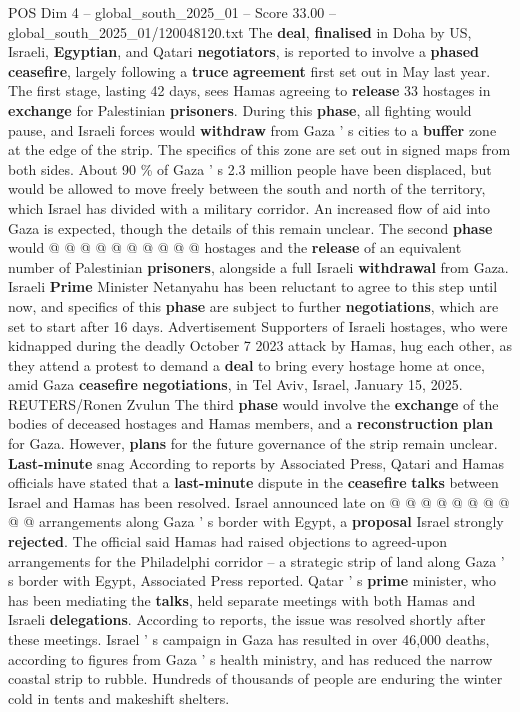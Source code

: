 \begin{textsample}{POS Dim 4 – global\_south\_2025\_01 – Score 33.00 – global\_south\_2025\_01/120048120.txt}
The \textbf{deal}, \textbf{finalised} in Doha by US, Israeli, \textbf{Egyptian}, and Qatari \textbf{negotiators}, is reported to involve a \textbf{phased} \textbf{ceasefire}, largely following a \textbf{truce} \textbf{agreement} first set out in May last year.
The first stage, lasting 42 days, sees Hamas agreeing to \textbf{release} 33 hostages in \textbf{exchange} for Palestinian \textbf{prisoners}.
During this \textbf{phase}, all fighting would pause, and Israeli forces would \textbf{withdraw} from Gaza ' s cities to a \textbf{buffer} zone at the edge of the strip.
The specifics of this zone are set out in signed maps from both sides.
About 90 \% of Gaza ' s 2.3 million people have been displaced, but would be allowed to move freely between the south and north of the territory, which Israel has divided with a military corridor.
An increased flow of aid into Gaza is expected, though the details of this remain unclear.
The second \textbf{phase} would @ @ @ @ @ @ @ @ @ @ hostages and the \textbf{release} of an equivalent number of Palestinian \textbf{prisoners}, alongside a full Israeli \textbf{withdrawal} from Gaza.
Israeli \textbf{Prime} Minister Netanyahu has been reluctant to agree to this step until now, and specifics of this \textbf{phase} are subject to further \textbf{negotiations}, which are set to start after 16 days.
Advertisement Supporters of Israeli hostages, who were kidnapped during the deadly October 7 2023 attack by Hamas, hug each other, as they attend a protest to demand a \textbf{deal} to bring every hostage home at once, amid Gaza \textbf{ceasefire} \textbf{negotiations}, in Tel Aviv, Israel, January 15, 2025.
REUTERS/Ronen Zvulun The third \textbf{phase} would involve the \textbf{exchange} of the bodies of deceased hostages and Hamas members, and a \textbf{reconstruction} \textbf{plan} for Gaza.
However, \textbf{plans} for the future governance of the strip remain unclear. \textbf{Last-minute} snag According to reports by Associated Press, Qatari and Hamas officials have stated that a \textbf{last-minute} dispute in the \textbf{ceasefire} \textbf{talks} between Israel and Hamas has been resolved.
Israel announced late on @ @ @ @ @ @ @ @ @ @ arrangements along Gaza ' s border with Egypt, a \textbf{proposal} Israel strongly \textbf{rejected}.
The official said Hamas had raised objections to agreed-upon arrangements for the Philadelphi corridor -- a strategic strip of land along Gaza ' s border with Egypt, Associated Press reported.
Qatar ' s \textbf{prime} minister, who has been mediating the \textbf{talks}, held separate meetings with both Hamas and Israeli \textbf{delegations}.
According to reports, the issue was resolved shortly after these meetings.
Israel ' s campaign in Gaza has resulted in over 46,000 deaths, according to figures from Gaza ' s health ministry, and has reduced the narrow coastal strip to rubble.
Hundreds of thousands of people are enduring the winter cold in tents and makeshift shelters.


\end{textsample}
